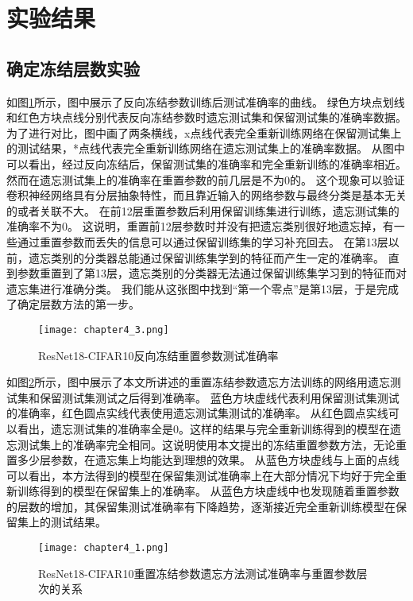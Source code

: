 \section{实验结果}
\subsection{确定冻结层数实验}
如图\ref{fig:chapter4_3}所示，图中展示了反向冻结参数训练后测试准确率的曲线。
绿色方块点划线和红色方块点线分别代表反向冻结参数时遗忘测试集和保留测试集的准确率数据。
为了进行对比，图中画了两条横线，x点线代表完全重新训练网络在保留测试集上的测试结果，*点线代表完全重新训练网络在遗忘测试集上的准确率数据。
从图中可以看出，经过反向冻结后，保留测试集的准确率和完全重新训练的准确率相近。然而在遗忘测试集上的准确率在重置参数的前几层是不为0的。
这个现象可以验证卷积神经网络具有分层抽象特性，而且靠近输入的网络参数与最终分类是基本无关的或者关联不大。
在前12层重置参数后利用保留训练集进行训练，遗忘测试集的准确率不为0。
这说明，重置前12层参数时并没有把遗忘类别很好地遗忘掉，有一些通过重置参数而丢失的信息可以通过保留训练集的学习补充回去。
在第13层以前，遗忘类别的分类器总能通过保留训练集学到的特征而产生一定的准确率。
直到参数重置到了第13层，遗忘类别的分类器无法通过保留训练集学习到的特征而对遗忘集进行准确分类。
我们能从这张图中找到“第一个零点”是第13层，于是完成了确定层数方法的第一步。
\begin{figure}
    \centering
    \texttt{[image: chapter4\_3.png]}
    \caption{ResNet18-CIFAR10反向冻结重置参数测试准确率}
    \label{fig:chapter4_3}
\end{figure}

如图\ref{fig:chapter4_1}所示，图中展示了本文所讲述的重置冻结参数遗忘方法训练的网络用遗忘测试集和保留测试集测试之后得到准确率。
蓝色方块虚线代表利用保留测试集测试的准确率，红色圆点实线代表使用遗忘测试集测试的准确率。
从红色圆点实线可以看出，遗忘测试集的准确率全是0。这样的结果与完全重新训练得到的模型在遗忘测试集上的准确率完全相同。这说明使用本文提出的冻结重置参数方法，无论重置多少层参数，在遗忘集上均能达到理想的效果。
从蓝色方块虚线与上面的点线可以看出，本方法得到的模型在保留集测试准确率上在大部分情况下均好于完全重新训练得到的模型在保留集上的准确率。
从蓝色方块虚线中也发现随着重置参数的层数的增加，其保留集测试准确率有下降趋势，逐渐接近完全重新训练模型在保留集上的测试结果。
\begin{figure}
    \centering
    \texttt{[image: chapter4\_1.png]}
    \caption{ResNet18-CIFAR10重置冻结参数遗忘方法测试准确率与重置参数层次的关系}
    \label{fig:chapter4_1}
\end{figure}

